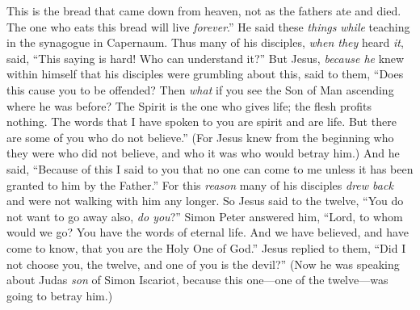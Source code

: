 \begin{biblechapter}
\verse This is the bread that came down from heaven, not as the fathers ate and died. The one who eats this bread will live \textit{forever}.”
 He said these \textit{things} \textit{while} teaching in the synagogue in Capernaum.
\verse Thus many of his disciples, \textit{when they} heard \textit{it}, said, “This saying is hard! Who can understand it?”
\verse But Jesus, \textit{because he} knew within himself that his disciples were grumbling about this, said to them, “Does this cause you to be offended?
\verse Then \textit{what} if you see the Son of Man ascending where he was before?
\verse The Spirit is the one who gives life; the flesh profits nothing. The words that I have spoken to you are spirit and are life.
\verse But there are some of you who do not believe.” (For Jesus knew from the beginning who they were who did not believe, and who it was who would betray him.)
\verse And he said, “Because of this I said to you that no one can come to me unless it has been granted to him by the Father.”
 For this \textit{reason} many of his disciples \textit{drew back} and were not walking with him any longer.
\verse So Jesus said to the twelve, “You do not want to go away also, \textit{do you}?”
\verse Simon Peter answered him, “Lord, to whom would we go? You have the words of eternal life.
\verse And we have believed, and have come to know, that you are the Holy One of God.”
\verse Jesus replied to them, “Did I not choose you, the twelve, and one of you is the devil?”
\verse (Now he was speaking about Judas \textit{son} of Simon Iscariot, because this one—one of the twelve—was going to betray him.)
\end{biblechapter}

